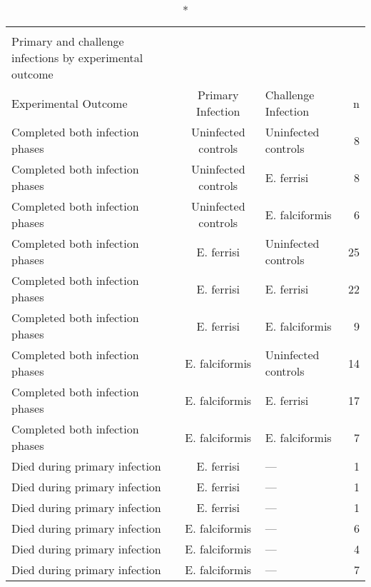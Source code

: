 \begin{longtable}{lclr}
\caption*{
{\large Infection history summary} \\ 
{\small Primary and challenge infections by experimental outcome}
} \\ 
\toprule
Experimental Outcome & Primary Infection & Challenge Infection & n \\ 
\midrule\addlinespace[2.5pt]
Completed both infection phases & Uninfected controls & Uninfected controls & 8 \\ 
Completed both infection phases & Uninfected controls & E. ferrisi & 8 \\ 
Completed both infection phases & Uninfected controls & E. falciformis & 6 \\ 
Completed both infection phases & E. ferrisi & Uninfected controls & 25 \\ 
Completed both infection phases & E. ferrisi & E. ferrisi & 22 \\ 
Completed both infection phases & E. ferrisi & E. falciformis & 9 \\ 
Completed both infection phases & E. falciformis & Uninfected controls & 14 \\ 
Completed both infection phases & E. falciformis & E. ferrisi & 17 \\ 
Completed both infection phases & E. falciformis & E. falciformis & 7 \\ 
Died during primary infection & E. ferrisi & — & 1 \\ 
Died during primary infection & E. ferrisi & — & 1 \\ 
Died during primary infection & E. ferrisi & — & 1 \\ 
Died during primary infection & E. falciformis & — & 6 \\ 
Died during primary infection & E. falciformis & — & 4 \\ 
Died during primary infection & E. falciformis & — & 7 \\ 
\bottomrule
\end{longtable}

